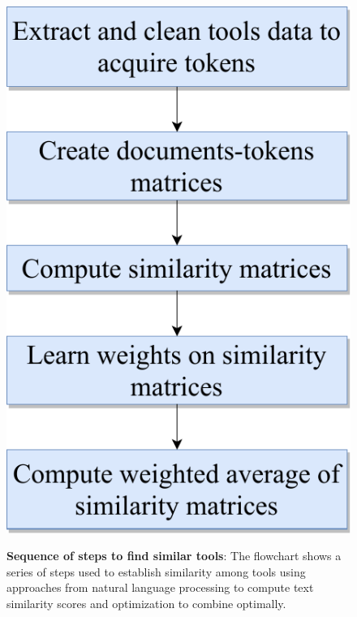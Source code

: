\begin{figure}[h]
\begin{centering}
    {\includegraphics[scale=0.7]{figures/tool_sim_flow.pdf}}
    \caption[Sequence of steps to find similar tools]{\textbf{Sequence of steps to find similar tools}: The flowchart shows a series of steps used to establish similarity among tools using approaches from natural language processing to compute text similarity scores and optimization to combine optimally.}
\end{centering}
\end{figure}
    
